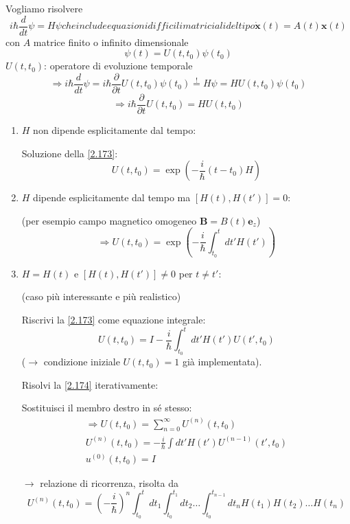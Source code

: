 \documentclass[a4paper,11pt]{report}
\newcommand{\vect}[1]{\boldsymbol{#1}}
\newcommand{\x}{\boldsymbol{x}}
\begin{document}
Vogliamo risolvere
\begin{subequations}
\begin{equation}
i\hbar \frac{d}{dt}\psi = H \psi 
\label{2.171a}
\end{equation}
che include equazioni difficili matriciali del tipo 
\begin{equation}
\dot{\x}(t)=A(t)\x(t)
\label{2.171b}
\end{equation}
\end{subequations}
con $A$ matrice finito o infinito dimensionale
\begin{equation}
\psi(t)=U(t,t_0)\psi(t_0)
\label{2.172}
\end{equation}
$U(t,t_0)$: operatore di evoluzione temporale
\[
\Rightarrow i\hbar \frac{d}{dt}\psi = i\hbar \frac{\partial}{\partial t}U(t,t_0)\psi(t_0)\overset{!}{=}H\psi = HU(t,t_0)\psi(t_0)
\]
\begin{equation}
\Rightarrow i\hbar \frac{\partial }{\partial t}U(t,t_0)=HU(t,t_0) 
\label{2.173}
\end{equation}
\begin{enumerate}[label=(\roman*)]
\item $H$ non dipende esplicitamente dal tempo:

Soluzione della \eqref{2.173}:
\[
U(t,t_0)=\exp \left(-\frac{i}{\hbar}(t-t_0)H\right)
\]
\item $H$ dipende esplicitamente dal tempo ma $[H(t),H(t')]=0$:

(per esempio campo magnetico omogeneo $\vect{B}=B(t)\vect{e}_z$)
\[
\Rightarrow U(t,t_0)=\exp \left(-\frac{i}{\hbar}\int_{t_0}^t dt' H(t')\right)
\]
\item $H=H(t)$ e $[H(t),H(t')]\neq 0$ per $t\neq t'$:

(caso pi\`u interessante e pi\`u realistico)

Riscrivi la \eqref{2.173} come equazione integrale:
\begin{equation}
U(t,t_0) = I - \frac{i}{\hbar}\int_{t_0}^t dt' H(t')U(t',t_0)
\label{2.174}
\end{equation}
($\rightarrow$ condizione iniziale $U(t,t_0)=1$ già implementata).

Risolvi la \eqref{2.174} iterativamente: 

Sostituisci il membro destro in s\'e stesso:
\begin{equation}
\begin{gathered}
\Rightarrow U(t,t_0)=\sum_{n=0}^\infty U^{(n)}(t,t_0)\\
U^{(n)}(t,t_0)=-\frac{i}{\hbar}\int dt' H(t') U^{(n-1)}(t',t_0)\\
u^{(0)}(t,t_0)=I
\end{gathered} 
\label{2.175}
\end{equation}

$\rightarrow$ relazione di ricorrenza, risolta da
\begin{equation}
U^{(n)}(t,t_0)=\left(-\frac{i}{\hbar}\right)^n\int_{t_0}^tdt_1 \int_{t_0}^{t_1}dt_2 \ldots \int_{t_0}^{t_{n-1}}dt_n H(t_1)H(t_2) \ldots H(t_n)
\label{2.176}
\end{equation}
\end{enumerate}
\end{document}
